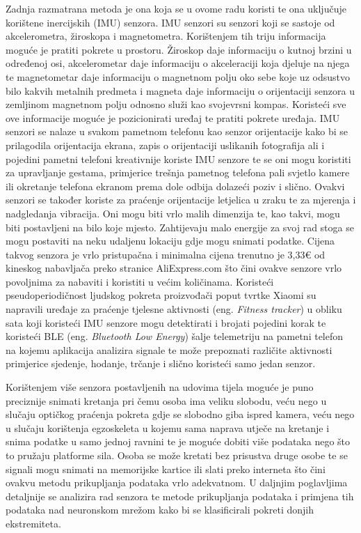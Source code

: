 \documentclass[times, utf8, diplomski]{fer}
\begin{document}
Zadnja razmatrana metoda je ona koja se u ovome radu koristi te ona uključuje korištene inercijskih (IMU) senzora. IMU senzori su
senzori koji se sastoje od akcelerometra, žiroskopa i magnetometra. Korištenjem tih triju informacija moguće je pratiti pokrete u
prostoru. Žiroskop daje informaciju o kutnoj brzini u određenoj osi, akcelerometar daje informaciju o akceleraciji koja djeluje na njega
te magnetometar daje informaciju o magnetnom polju oko sebe koje uz odsustvo bilo kakvih metalnih predmeta i magneta daje informaciju
o orijentaciji senzora u zemljinom magnetnom polju odnosno služi kao svojevrsni kompas. Koristeći sve ove informacije moguće je
pozicionirati uređaj te pratiti pokrete uređaja. IMU senzori se nalaze u svakom pametnom telefonu kao senzor orijentacije kako bi se
prilagodila orijentacija ekrana, zapis o orijentaciji uslikanih fotografija ali i pojedini pametni telefoni kreativnije koriste IMU
senzore te se oni mogu koristiti za upravljanje gestama, primjerice trešnja pametnog telefona pali svjetlo kamere ili
okretanje telefona ekranom prema dole odbija dolazeći poziv i slično. Ovakvi senzori se također koriste za praćenje orijentacije
letjelica u zraku te za mjerenja i nadgledanja vibracija. Oni mogu biti vrlo
malih dimenzija te, kao takvi, mogu biti postavljeni na bilo koje mjesto. Zahtijevaju malo energije za svoj rad stoga se mogu
postaviti na neku udaljenu lokaciju gdje mogu snimati podatke. Cijena takvog senzora je vrlo pristupačna i minimalna cijena trenutno
je 3,33€ od kineskog nabavljača preko stranice AliExpress.com što čini ovakve senzore vrlo povoljnima za nabaviti i koristiti u
većim količinama. Koristeći pseudoperiodičnost ljudskog pokreta proizvođači poput tvrtke Xiaomi su napravili uređaje za praćenje
tjelesne aktivnosti (eng. \textit{Fitness tracker}) u obliku sata koji koristeći IMU senzore mogu detektirati i brojati pojedini korak 
te koristeći BLE (eng. \textit{Bluetooth Low Energy}) šalje telemetriju na pametni telefon na kojemu aplikacija analizira signale
te može prepoznati različite aktivnosti primjerice sjedenje, hodanje, trčanje i slično koristeći samo jedan senzor.

Korištenjem više senzora postavljenih na udovima tijela moguće je puno preciznije snimati kretanja pri čemu osoba ima veliku slobodu,
veću nego u slučaju optičkog praćenja pokreta gdje se slobodno giba ispred kamera, veću nego u slučaju korištenja egzoskeleta u
kojemu sama naprava utječe na kretanje i snima podatke u samo jednoj ravnini te je moguće dobiti više podataka nego što to pružaju
platforme sila. Osoba se može kretati bez prisustva druge osobe te se signali mogu snimati na memorijske kartice ili slati preko
interneta što čini ovakvu metodu prikupljanja podataka vrlo adekvatnom. U daljnjim poglavljima detaljnije se analizira
rad senzora te metode prikupljanja podataka i primjena tih podataka nad neuronskom mrežom kako bi se klasificirali pokreti donjih
ekstremiteta.
\end{document}
